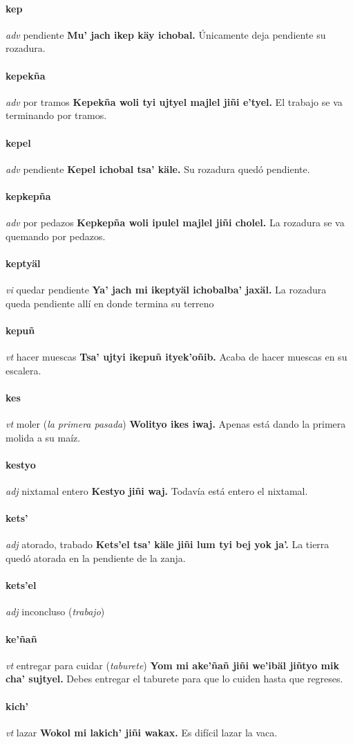 \documentclass{scrbook}
\newcommand{\entry}[1]{\paragraph{#1}}
\newcommand{\partofspeech}[1]{\textit{#1}}
\newcommand{\spanishtranslation}[1]{#1}
\newcommand{\clarification}[1]{(\textit{#1})}
\newcommand{\cholexample}[1]{\textbf{#1}}
\newcommand{\exampletranslation}[1]{#1}
\begin{document}
\begin{multicols}{2}
\entry{kep}
\partofspeech{adv}
\spanishtranslation{pendiente}
\cholexample{Mu' jach ikep käy ichobal.}
\exampletranslation{Únicamente deja pendiente su rozadura.}

\entry{kepekña}
\partofspeech{adv}
\spanishtranslation{por tramos}
\cholexample{Kepekña woli tyi ujtyel majlel jiñi e'tyel.}
\exampletranslation{El trabajo se va terminando por tramos.}

\entry{kepel}
\partofspeech{adv}
\spanishtranslation{pendiente}
\cholexample{Kepel ichobal tsa' käle.}
\exampletranslation{Su rozadura quedó pendiente.}

\entry{kepkepña}
\partofspeech{adv}
\spanishtranslation{por pedazos}
\cholexample{Kepkepña woli ipulel majlel jiñi cholel.}
\exampletranslation{La rozadura se va quemando por pedazos.}

\entry{keptyäl}
\partofspeech{vi}
\spanishtranslation{quedar pendiente}
\cholexample{Ya' jach mi ikeptyäl ichobalba' jaxäl.}
\exampletranslation{La rozadura queda pendiente allí en donde termina su terreno}

\entry{kepuñ}
\partofspeech{vt}
\spanishtranslation{hacer muescas}
\cholexample{Tsa' ujtyi ikepuñ ityek'oñib.}
\exampletranslation{Acaba de hacer muescas en su escalera.}

\entry{kes}
\partofspeech{vt}
\spanishtranslation{moler}
\clarification{la primera pasada}
\cholexample{Wolityo ikes iwaj.}
\exampletranslation{Apenas está dando la primera molida a su maíz.}

\entry{kestyo}
\partofspeech{adj}
\spanishtranslation{nixtamal entero}
\cholexample{Kestyo jiñi waj.}
\exampletranslation{Todavía está entero el nixtamal.}

\entry{kets'}
\partofspeech{adj}
\spanishtranslation{atorado, trabado}
\cholexample{Kets'el tsa' käle jiñi lum tyi bej yok ja'.}
\exampletranslation{La tierra quedó atorada en la pendiente de la zanja.}

\entry{kets'el}
\partofspeech{adj}
\spanishtranslation{inconcluso}
\clarification{trabajo}

\entry{ke'ñañ}
\partofspeech{vt}
\spanishtranslation{entregar para cuidar}
\clarification{taburete}
\cholexample{Yom mi ake'ñañ jiñi we'ibäl jiñtyo mik cha' sujtyel.}
\exampletranslation{Debes entregar el taburete para que lo cuiden hasta que regreses.}

\entry{kich'}
\partofspeech{vt}
\spanishtranslation{lazar}
\cholexample{Wokol mi lakich' jiñi wakax.}
\exampletranslation{Es difícil lazar la vaca.}


\end{multicols}
\end{document}
